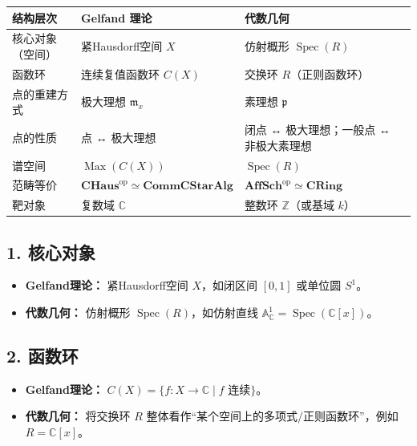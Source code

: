 \documentclass[10pt, openany]{book}
\begin{document}
\begin{table}[h!]
\centering
\begin{tabular}{|p{4cm}|p{6cm}|p{6cm}|}
\hline
\textbf{结构层次} & \textbf{Gelfand 理论} & \textbf{代数几何} \\
\hline
核心对象（空间） & 紧Hausdorff空间 \(X\) & 仿射概形 \(\operatorname{Spec}(R)\) \\
\hline
函数环 & 连续复值函数环 \(C(X)\) & 交换环 \(R\)（正则函数环） \\
\hline
点的重建方式 & 极大理想 \(\mathfrak{m}_x\) & 素理想 \(\mathfrak{p}\) \\
\hline
点的性质 & 点 ↔ 极大理想 & 闭点 ↔ 极大理想；一般点 ↔ 非极大素理想 \\
\hline
谱空间 & \(\operatorname{Max}(C(X))\) & \(\operatorname{Spec}(R)\) \\
\hline
范畴等价 & \(\mathbf{CHaus}^{\mathrm{op}} \simeq \mathbf{CommCStarAlg}\) & \(\mathbf{AffSch}^{\mathrm{op}} \simeq \mathbf{CRing}\) \\
\hline
靶对象 & 复数域 \(\mathbb{C}\) & 整数环 \(\mathbb{Z}\)（或基域 \(k\)） \\
\hline
\end{tabular}
\end{table}

\subsection*{1. 核心对象}
\begin{itemize}
    \item \textbf{Gelfand理论：} 紧Hausdorff空间 \(X\)，如闭区间 \([0,1]\) 或单位圆 \(S^1\)。
    \item \textbf{代数几何：} 仿射概形 \(\operatorname{Spec}(R)\)，如仿射直线 \(\mathbb{A}^1_{\mathbb{C}} = \operatorname{Spec}(\mathbb{C}[x])\)。
\end{itemize}

\subsection*{2. 函数环}
\begin{itemize}
    \item \textbf{Gelfand理论：} \(C(X) = \{ f : X \to \mathbb{C} \mid f \text{ 连续} \}\)。
    \item \textbf{代数几何：} 将交换环 \(R\) 整体看作“某个空间上的多项式/正则函数环”，例如 \(R = \mathbb{C}[x]\)。
\end{itemize}
\end{document}
